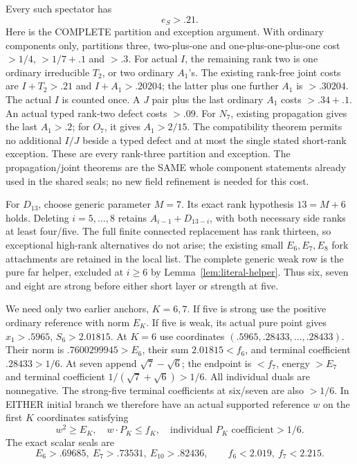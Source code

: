 \documentclass[11pt]{article}
\begin{document}
Every such spectator has
\[
                                e_S>.21 .
\tag{S3}\label{eq:arithD13spectator}
\]
Here is the COMPLETE partition and exception argument.
With ordinary components only, partitions three,
two-plus-one and one-plus-one-plus-one cost
\(>1/4\), \(>1/7+.1\) and \(>.3\).
For actual \(I\), the remaining rank two is one
ordinary irreducible \(T_2\), or two ordinary \(A_1\)'s.
The existing rank-free joint costs are
\(I+T_2>.21\) and \(I+A_1>.20204\);
the latter plus one further \(A_1\) is \(>.30204\).
The actual \(I\) is counted once.
A \(J\) pair plus the last ordinary \(A_1\)
costs \(>.34+.1\).
An actual typed rank-two defect costs \(>.09\).
For \(N_7\), existing propagation gives the last
\(A_1>.2\); for \(O_7\), it gives \(A_1>2/15\).
The compatibility theorem permits no additional
\(I/J\) beside a typed defect and at most the
single stated short-rank exception.
These are every rank-three partition and exception.
The propagation/joint theorems are the SAME whole
component statements already used in the shared seals;
no new field refinement is needed for this cost.

For \(D_{13}\), choose generic parameter \(M=7\).
Its exact rank hypothesis \(13=M+6\) holds.
Deleting \(i=5,\ldots,8\) retains
\(A_{i-1}+D_{13-i}\), with both necessary side
ranks at least four/five.
The full finite connected replacement has rank
thirteen, so exceptional high-rank alternatives
do not arise; the existing small \(E_6,E_7,E_8\)
fork attachments are retained in the local list.
The complete generic weak row is the pure far
helper, excluded at \(i\ge6\) by
Lemma~\ref{lem:literal-helper}.
Thus six, seven and eight are strong before
either short layer or strength at five.

We need only two earlier anchors, \(K=6,7\).
If five is strong use the positive ordinary
reference with norm \(E_K\).
If five is weak, its actual pure point gives
\(x_1>.5965\), \(S_6>2.01815\).
At \(K=6\) use coordinates
\((.5965,.28433,\ldots,.28433)\).
Their norm is \(.7600299945>E_6\), their sum
\(2.01815<f_6\), and terminal coefficient
\(.28433>1/6\).
At seven append \(\sqrt7-\sqrt6\);
the endpoint is \(<f_7\), energy \(>E_7\)
and terminal coefficient
\(1/(\sqrt7+\sqrt6)>1/6\).
All individual duals are nonnegative.
The strong-five terminal coefficients at six/seven
are also \(>1/6\).
In EITHER initial branch we therefore have an
actual supported reference \(w\) on the first \(K\)
coordinates satisfying
\[
 w^2\ge E_K,\quad w\cdot P_K\le f_K,\quad
        \text{individual }P_K\text{ coefficient}>1/6 .
\]
The exact scalar seals are
\[
 E_6>.69685,\ E_7>.73531,\ E_{10}>.82436,\qquad
 f_6<2.019,\ f_7<2.215.
\]
\end{document}
